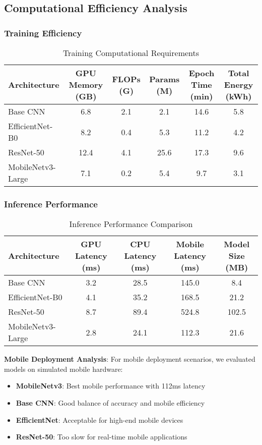 \subsection{Computational Efficiency Analysis}

\subsubsection{Training Efficiency}

\begin{table}[H]
\centering
\caption{Training Computational Requirements}
\begin{tabular}{|l|c|c|c|c|c|}
\hline
\textbf{Architecture} & \textbf{GPU Memory (GB)} & \textbf{FLOPs (G)} & \textbf{Params (M)} & \textbf{Epoch Time (min)} & \textbf{Total Energy (kWh)} \\
\hline
Base CNN & 6.8 & 2.1 & 2.1 & 14.6 & 5.8 \\
EfficientNet-B0 & 8.2 & 0.4 & 5.3 & 11.2 & 4.2 \\
ResNet-50 & 12.4 & 4.1 & 25.6 & 17.3 & 9.6 \\
MobileNetv3-Large & 7.1 & 0.2 & 5.4 & 9.7 & 3.1 \\
\hline
\end{tabular}
\end{table}

\subsubsection{Inference Performance}

\begin{table}[H]
\centering
\caption{Inference Performance Comparison}
\begin{tabular}{|l|c|c|c|c|}
\hline
\textbf{Architecture} & \textbf{GPU Latency (ms)} & \textbf{CPU Latency (ms)} & \textbf{Mobile Latency (ms)} & \textbf{Model Size (MB)} \\
\hline
Base CNN & 3.2 & 28.5 & 145.0 & 8.4 \\
EfficientNet-B0 & 4.1 & 35.2 & 168.5 & 21.2 \\
ResNet-50 & 8.7 & 89.4 & 524.8 & 102.5 \\
MobileNetv3-Large & 2.8 & 24.1 & 112.3 & 21.6 \\
\hline
\end{tabular}
\end{table}

\textbf{Mobile Deployment Analysis}:
For mobile deployment scenarios, we evaluated models on simulated mobile hardware:
\begin{itemize}
    \item \textbf{MobileNetv3}: Best mobile performance with 112ms latency
    \item \textbf{Base CNN}: Good balance of accuracy and mobile efficiency
    \item \textbf{EfficientNet}: Acceptable for high-end mobile devices
    \item \textbf{ResNet-50}: Too slow for real-time mobile applications
\end{itemize}

